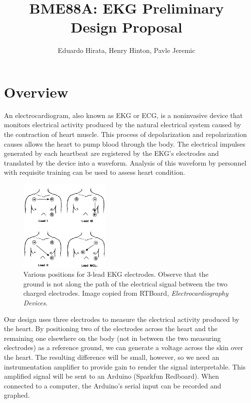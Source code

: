 \documentclass[11pt, oneside]{article}   	%
\title{BME88A: EKG Preliminary Design Proposal}
\author{Eduardo Hirata, Henry Hinton, Pavle Jeremic}
\begin{document}
\maketitle
\section{Overview}
	
	\onehalfspace

\par An electrocardiogram, also known as EKG or ECG, is a noninvasive device that monitors electrical activity produced by the natural electrical system caused by the contraction of heart muscle. This process of depolarization and repolarization causes allows the heart to pump blood through the body. The electrical impulses generated by each heartbeat are registered by the EKG's electrodes and translated by the device into a waveform. Analysis of this waveform by personnel with requisite training can be used to assess heart condition.
 

\begin{figure}
	\includegraphics[width=0.4\textwidth]{ecg}
	\caption{Various positions for 3-lead EKG electrodes. Observe that the ground is not along the path of the electrical signal between the two charged electrodes. \cite{ecgpos} Image copied from RTBoard, \textit{Electrocardiography Devices}.}
\end{figure}

\par Our design uses three electrodes to measure the electrical activity produced by the heart. By positioning two of the electrodes across the heart and the remaining one elsewhere on the body (not in between the two measuring electrodes) as a reference ground, we can generate a voltage across the skin over the heart. The resulting difference will be small, however, so we need an instrumentation amplifier to provide gain to render the signal interpretable. This amplified signal will be sent to an Arduino (Sparkfun Redboard). When connected to a computer, the Arduino's serial input can be recorded and graphed.
\end{document}
